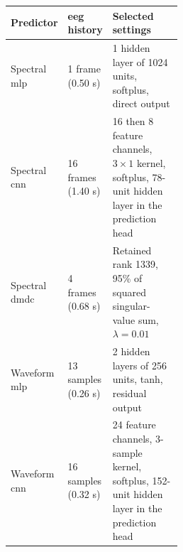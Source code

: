 \begin{tabular}{@{}llp{0.48\linewidth}@{}}
\toprule
Predictor & \acs{eeg} history & Selected settings \\
\midrule
Spectral \acs{mlp} & 1 frame (0.50 s) & 1 hidden layer of 1024 units, softplus, direct output \\
Spectral \acs{cnn} & 16 frames (1.40 s) & 16 then 8 feature channels, \(3\times1\) kernel, softplus, 78-unit hidden layer in the prediction head \\
Spectral \acs{dmdc} & 4 frames (0.68 s) & Retained rank 1339, 95\% of squared singular-value sum, \(\lambda=0.01\) \\
Waveform \acs{mlp} & 13 samples (0.26 s) & 2 hidden layers of 256 units, tanh, residual output \\
Waveform \acs{cnn} & 16 samples (0.32 s) & 24 feature channels, 3-sample kernel, softplus, 152-unit hidden layer in the prediction head \\
\bottomrule
\end{tabular}
